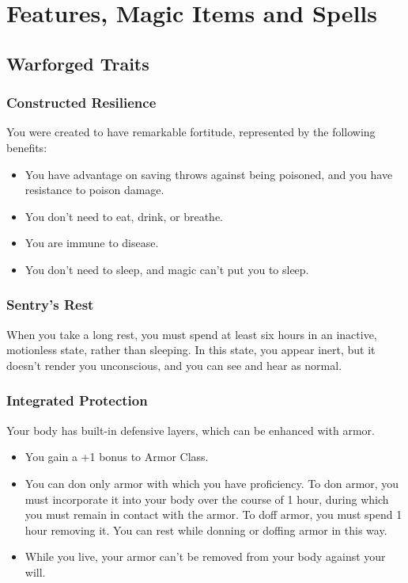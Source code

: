 \documentclass[letterpaper,openany,oneside,twocolumn]{book}
\begin{document}
\onecolumn


\rendercharactersheet

\renderbackgroundsheet

\renderspellsheet



\restoregeometry
\twocolumn

\chapter*{Features, Magic Items and Spells}

\section*{Warforged Traits}
\subsection*{Constructed Resilience}
You were created to have remarkable fortitude, represented by the following benefits:
\begin{itemize}
	\item You have advantage on saving throws against being poisoned, and you have resistance to poison damage.
	\item You don't need to eat, drink, or breathe.
	\item You are immune to disease.
	\item You don't need to sleep, and magic can't put you to sleep.
\end{itemize}
\subsection*{Sentry's Rest}
When you take a long rest, you must spend at least six hours in an inactive, motionless state, rather than sleeping. In this state, you appear inert, but it doesn't render you unconscious, and you can see and hear as normal.
\subsection*{Integrated Protection}
Your body has built-in defensive layers, which can be enhanced with armor.
\begin{itemize}
	\item You gain a +1 bonus to Armor Class.
	\item You can don only armor with which you have proficiency. To don armor, you must incorporate it into your body over the course of 1 hour, during which you must remain in contact with the armor. To doff armor, you must spend 1 hour removing it. You can rest while donning or doffing armor in this way.
	\item While you live, your armor can't be removed from your body against your will.
\end{itemize}
\end{document}
